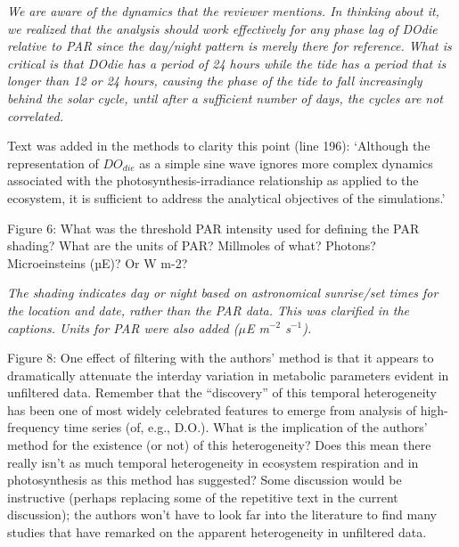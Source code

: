 \documentclass[letterpaper,12pt]{article}\usepackage[]{graphicx}\usepackage[]{color}
\begin{document}
{\it We are aware of the dynamics that the reviewer mentions.  In thinking about it, we realized that the analysis should work effectively for any phase lag of DOdie relative to PAR since the day/night pattern is merely there for reference.  What is critical is that DOdie has a period of 24 hours while the tide has a period that is longer than 12 or 24 hours, causing the phase of the tide to fall increasingly behind the solar cycle, until after a sufficient number of days, the cycles are not correlated.    

Text was added in the methods to clarity this point (line 196): `Although the representation of $DO_{die}$ as a simple sine wave ignores more complex dynamics associated with the photosynthesis-irradiance relationship as applied to the ecosystem, it is sufficient to address the analytical objectives of the simulations.'
}

Figure 6: What was the threshold PAR intensity used for defining the PAR shading? What are the units of PAR? Millmoles of what? Photons? Microeinsteins (µE)? Or W m-2?

{\it The shading indicates day or night based on astronomical sunrise/set times for the location and date, rather than the PAR data.  This was clarified in the captions.  Units for PAR were also added ($\mu$E m$^{-2}$ s$^{-1}$).}
 
Figure 8: One effect of filtering with the authors’ method is that it appears to dramatically attenuate the interday variation in metabolic parameters evident in unfiltered data. Remember that the “discovery” of this temporal heterogeneity has been one of most widely celebrated features to emerge from analysis of high-frequency time series (of, e.g., D.O.). What is the implication of the authors’ method for the existence (or not) of this heterogeneity? Does this mean there really isn’t as much temporal heterogeneity in ecosystem respiration and in photosynthesis as this method has suggested? Some discussion would be instructive (perhaps
replacing some of the repetitive text in the current discussion); the authors won’t have to look far into the literature to find many studies that have remarked on the apparent heterogeneity in unfiltered data.
\end{document}
